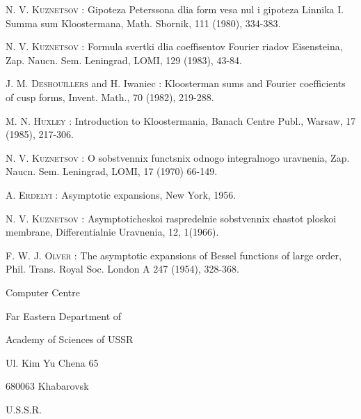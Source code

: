 \begin{thebibliography}{99}
 \textsc{N. V. Kuznetsov} : Gipoteza Peterssona dlia form vesa nul i gipoteza Linnika I. Summa sum Kloostermana, Math. Sbornik, 111 (1980), 334-383.

 \textsc{N. V. Kuznetsov} : Formula svertki dlia coeffisentov Fourier riadov Eisensteina, Zap. Naucn. Sem. Leningrad, LOMI, 129 (1983), 43-84.

  \textsc{J. M. Deshouillers} and H. Iwaniec : Kloosterman sums and Fourier coefficients of cusp forms, Invent. Math., 70 (1982), 219-288.

  \textsc{M. N. Huxley} : Introduction to Kloostermania, Banach Centre Publ., Warsaw, 17 (1985), 217-306.

  \textsc{N. V. Kuznetsov} : O sobstvennix functsnix odnogo integralnogo uravnenia, Zap. Naucn. Sem. Leningrad, LOMI, 17 (1970) 66-149.

  \textsc{A. Erdelyi} : Asymptotic expansions, New York, 1956.

  \textsc{N. V. Kuznetsov} : Asymptoticheskoi raspredelnie sobstvennix chastot ploskoi membrane, Differentialnie Uravnenia, 12, 1(1966).

  \textsc{F. W. J. Olver} : The asymptotic expansions of Bessel functions of large order, Phil. Trans. Royal Soc. London A 247 (1954), 328-368.
\end{thebibliography}

\noindent
{\small Computer Centre}

\noindent
{\small Far Eastern Department of }

\noindent
{\small Academy of Sciences of USSR}

\noindent
{\small Ul. Kim Yu Chena 65}

\noindent
{\small 680063 Khabarovsk}

\noindent
{\small U.S.S.R.}
